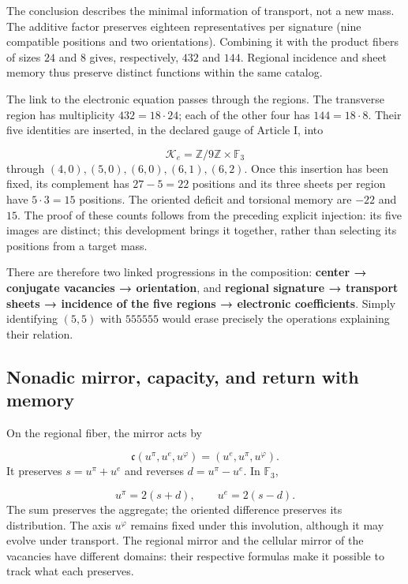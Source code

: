 The conclusion describes the minimal information of transport, not a
new mass. The additive factor preserves eighteen representatives per signature
(nine compatible positions and two orientations). Combining it with the
product fibers of sizes \(24\) and \(8\) gives, respectively,
\(432\) and \(144\). Regional incidence and sheet memory thus preserve
distinct functions within the same catalog.



The link to the electronic equation passes through the regions. The transverse region has multiplicity \(432=18\cdot24\); each of the other four has \(144=18\cdot8\). Their five identities are inserted, in the declared gauge of Article I, into

\[
\mathcal K_e=\mathbb Z/9\mathbb Z\times\mathbb F_3
\]
through \((4,0),(5,0),(6,0),(6,1),(6,2)\). Once this insertion has been fixed, its complement has \(27-5=22\) positions and its three sheets per region have \(5\cdot3=15\) positions. The oriented deficit and torsional memory are \(-22\) and \(15\). The proof of these counts follows from the preceding explicit injection: its five images are distinct; this development brings it together, rather than selecting its positions from a target mass.

There are therefore two linked progressions in the composition: \textbf{center → conjugate vacancies → orientation}, and \textbf{regional signature → transport sheets → incidence of the five regions → electronic coefficients}. Simply identifying \((5,5)\) with \(555555\) would erase precisely the operations explaining their relation.

\subsection{Nonadic mirror, capacity, and return with memory}
On the regional fiber, the mirror acts by

\[
\mathfrak c(u^\pi,u^e,u^\varphi)=(u^e,u^\pi,u^\varphi).
\]
It preserves \(s=u^\pi+u^e\) and reverses \(d=u^\pi-u^e\). In \(\mathbb F_3\),

\[
u^\pi=2(s+d),\qquad u^e=2(s-d).
\]
The sum preserves the aggregate; the oriented difference preserves its distribution. The axis \(u^\varphi\) remains fixed under this involution, although it may evolve under transport. The regional mirror and the cellular mirror of the vacancies have different domains: their respective formulas make it possible to track what each preserves.

